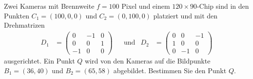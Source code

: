 Zwei Kameras mit Brennweite $f=100$ Pixel und einem $120\times 90$-Chip
sind in den Punkten $C_1=(100,0,0)$ und $C_2=(0,100,0)$ platziert
und mit den Drehmatrizen
\[
\begin{aligned}
D_1
&=
\begin{pmatrix}
   0& -1&  0\\
   0&  0&  1\\
  -1&  0&  0
\end{pmatrix}
&
&\text{und}
&
D_2
&=
\begin{pmatrix}
   0&  0& -1\\
   1&  0&  0\\
   0& -1&  0
\end{pmatrix}
\end{aligned}
\]
ausgerichtet.
Ein Punkt $Q$ wird von den Kameras auf die Bildpunkte
$B_1=(36,40)$ und $B_2=(65,58)$ abgebildet.
Bestimmen Sie den Punkt $Q$.


